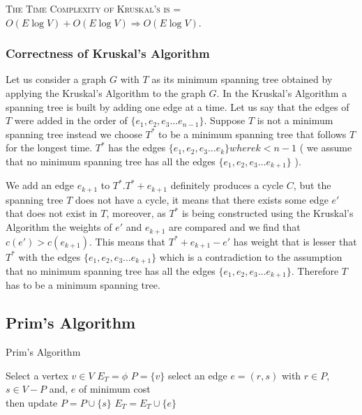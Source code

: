 \documentclass[12pt]{article}
\theoremstyle{plain}
\begin{document}
\noindent
\textsc{The Time Complexity of Kruskal's is }=$O(E \log V)+O(E\log V) \Rightarrow O(E\log V)$.


\subsubsection*{Correctness of Kruskal's Algorithm}

Let us consider a graph $G$ with $T$ as its minimum spanning tree obtained by applying the Kruskal's Algorithm to the graph $G$. In the Kruskal's Algorithm a spanning tree is built by adding one edge at a time. Let us say that the edges of  $T$ were added in the order of $\{e_1,e_2,e_3 \ldots e_{n-1}\}$. Suppose $T$ is not a minimum spanning tree instead we choose $T^*$ to be a minimum spanning tree that follows $T$ for the longest time. $T^*$ has the edges $\{e_1,e_2,e_3 \ldots e_{k}\} where  k<n-1$ ( we assume that no minimum spanning tree has all the edges $\{e_1,e_2,e_3 \ldots e_{k+1}\}$ ).

We add an edge $e_{k+1}$ to $T^*$.$T^* + e_{k+1}$ definitely produces a cycle $C$, but the spanning tree $T$ does not have a cycle, it means that there exists some edge $e'$ that does not exist in $T$, moreover, as $T^*$ is being constructed using the Kruskal's Algorithm the weights of $e'$ and $e_{k+1}$ are compared and we find that $c(e') > c(e_{k+1})$. This means that $T^*+e_{k+1}-e'$ has weight that is lesser that $T^*$  with the edges  $\{e_1,e_2,e_3 \ldots e_{k+1}\}$ which is a contradiction to the assumption that  no minimum spanning tree has all the edges $\{e_1,e_2,e_3 \ldots e_{k+1}\}$. Therefore $T$ has to be a minimum spanning tree.

\subsection*{Prim's Algorithm}

\noindent
\begin{minipage}{1.\linewidth}
\begin{algorithm2e}[H]
\caption{Prim's Algorithm}
\label{alg:Prim's algorithm}

Select a vertex $v \in V$\; \vspace{.1cm}
 $E_T = \phi$\; \vspace{.1cm}
 $P = \{v\}$\; \vspace{.1cm}
{
  {
  select an edge $e=(r,s)$ with $r \in P $, $s \in V-P$ and, $e$ of minimum cost\\
   then update
   $P=P \cup \{s\}$\;
   $E_T=E_T \cup \{e\}$\;
   }
}
\end{algorithm2e}
\end{minipage}
\end{document}
